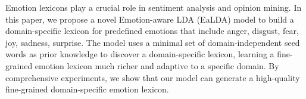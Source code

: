 Emotion lexicons play a crucial role in sentiment analysis and opinion mining. In this paper, we propose a novel Emotion-aware LDA (EaLDA) model to build a domain-specific lexicon for predefined emotions that include anger, disgust, fear, joy, sadness, surprise. The model uses a minimal set of domain-independent seed words as prior knowledge to discover a domain-specific lexicon, learning a fine-grained emotion lexicon much richer and adaptive to a specific domain. By comprehensive experiments, we show that our model can generate a high-quality fine-grained domain-specific emotion lexicon.
